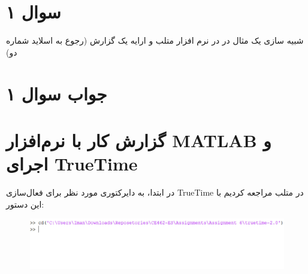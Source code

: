 \section*{سوال ۱}

شبیه سازی یک مثال
در
در نرم افزار متلب و ارایه یک گزارش (رجوع به اسلاید شماره دو)

\section*{جواب سوال ۱}

\section*{گزارش کار با نرم‌افزار MATLAB و اجرای TrueTime}

در ابتدا، به دایرکتوری مورد نظر برای فعال‌سازی TrueTime در متلب مراجعه کردیم با این دستور:
\begin{figure}[h]
	\centering
	\includegraphics{12.jpg}
	\label{fig:label4}
\end{figure}


